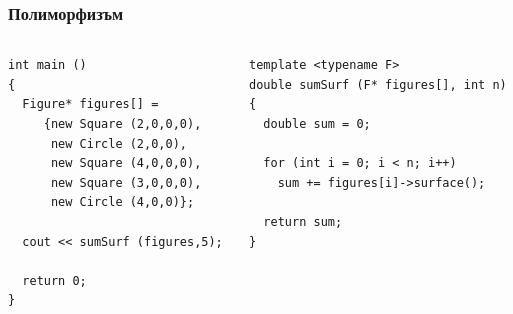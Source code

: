 \documentclass{beamer}
\begin{document}
\begin{frame}[fragile]
\frametitle{Полиморфизъм}


\begin{columns}[t]
  \begin{column}{0.5\textwidth}
\begin{flushleft}
\begin{lstlisting}
int main ()
{
  Figure* figures[] =  
     {new Square (2,0,0,0), 
      new Circle (2,0,0), 
      new Square (4,0,0,0),
      new Square (3,0,0,0),
      new Circle (4,0,0)};

  cout << sumSurf (figures,5);

  return 0;
}
\end{lstlisting}  
\end{flushleft}
  \end{column}
  \begin{column}{0.5\textwidth}


\begin{flushleft}
\begin{lstlisting}
template <typename F>
double sumSurf (F* figures[], int n)
{
  double sum = 0;
  
  for (int i = 0; i < n; i++)
    sum += figures[i]->surface();

  return sum;
}
\end{lstlisting}  
\end{flushleft}

  \end{column}
\end{columns}




\end{frame}
\end{document}
